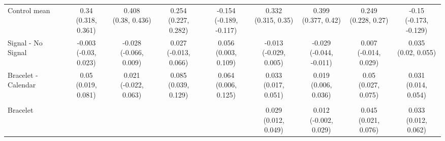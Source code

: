 \documentclass[
]{article}
\begin{document}
\begin{table}
{\begin{tabular}[t]{lcccccccc}
\addlinespace \addlinespace \hspace{1em}Control mean & \makecell[c]{0.34\\(0.318, 0.361)} & \makecell[c]{0.408\\(0.38, 0.436)} & \makecell[c]{0.254\\(0.227, 0.282)} & \makecell[c]{-0.154\\(-0.189, -0.117)} & \makecell[c]{0.332\\(0.315, 0.35)} & \makecell[c]{0.399\\(0.377, 0.42)} & \makecell[c]{0.249\\(0.228, 0.27)} & \makecell[c]{-0.15\\(-0.173, -0.129)}\\
\addlinespace \addlinespace \hspace{1em}Signal - No Signal & \makecell[c]{-0.003\\(-0.03, 0.023)} & \makecell[c]{-0.028\\(-0.066, 0.009)} & \makecell[c]{0.027\\(-0.013, 0.066)} & \makecell[c]{0.056\\(0.003, 0.109)} & \makecell[c]{-0.013\\(-0.029, 0.005)} & \makecell[c]{-0.029\\(-0.044, -0.011)} & \makecell[c]{0.007\\(-0.014, 0.029)} & \makecell[c]{0.035\\(0.02, 0.055)}\\
\addlinespace \addlinespace \hspace{1em}Bracelet - Calendar & \makecell[c]{0.05\\(0.019, 0.081)} & \makecell[c]{0.021\\(-0.022, 0.063)} & \makecell[c]{0.085\\(0.039, 0.129)} & \makecell[c]{0.064\\(0.006, 0.125)} & \makecell[c]{0.033\\(0.017, 0.051)} & \makecell[c]{0.019\\(0.006, 0.036)} & \makecell[c]{0.05\\(0.027, 0.075)} & \makecell[c]{0.031\\(0.014, 0.054)}\\
\addlinespace \addlinespace \addlinespace[0.3em]
\hline
\multicolumn{9}{l}{\textit{\textbf{Panel B: Signalling}}}\\
\hline
\hspace{1em}Bracelet &  &  &  &  & \makecell[c]{0.029\\(0.012, 0.049)} & \makecell[c]{0.012\\(-0.002, 0.029)} & \makecell[c]{0.045\\(0.021, 0.076)} & \makecell[c]{0.033\\(0.012, 0.062)}\\

\end{tabular}}
\end{table}
\end{document}
